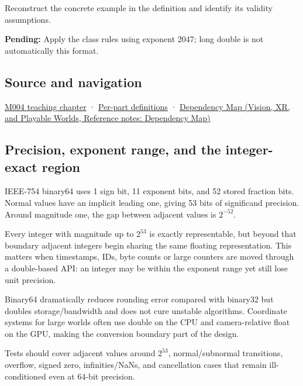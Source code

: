 Reconstruct the concrete example in the definition and identify its validity assumptions.

\textbf{Pending:} Apply the class rules using exponent 2047; long double is not automatically this format.

\subsection{Source and navigation}\label{appendix-5078dfab64e6-source-and-navigation}

\hyperref[01-foundations-i-ch001-a-stretching-ruler-for-real-valued-quantities]{M004 teaching chapter} · \hyperref[appendix-fd090d982a15-m004---parts-61-76]{Per-part definitions} · \href{../07-Vision-XR-and-Playable-Worlds/main.pdf\#nameddest=appendix-4ad47bdd269a}{Dependency Map (Vision, XR, and Playable Worlds, Reference notes: Dependency Map)}

\subsection{Precision, exponent range, and the integer-exact region}\label{appendix-5078dfab64e6-precision-exponent-range-and-the-integer-exact-region}

IEEE-754 binary64 uses 1 sign bit, 11 exponent bits, and 52 stored fraction bits. Normal values have an implicit leading one, giving 53 bits of significand precision. Around magnitude one, the gap between adjacent values is \(2^{-52}\).

Every integer with magnitude up to \(2^{53}\) is exactly representable, but beyond that boundary adjacent integers begin sharing the same floating representation. This matters when timestamps, IDs, byte counts or large counters are moved through a double-based API: an integer may be within the exponent range yet still lose unit precision.

Binary64 dramatically reduces rounding error compared with binary32 but doubles storage/bandwidth and does not cure unstable algorithms. Coordinate systems for large worlds often use double on the CPU and camera-relative float on the GPU, making the conversion boundary part of the design.

Tests should cover adjacent values around \(2^{53}\), normal/subnormal transitions, overflow, signed zero, infinities/NaNs, and cancellation cases that remain ill-conditioned even at 64-bit precision.
